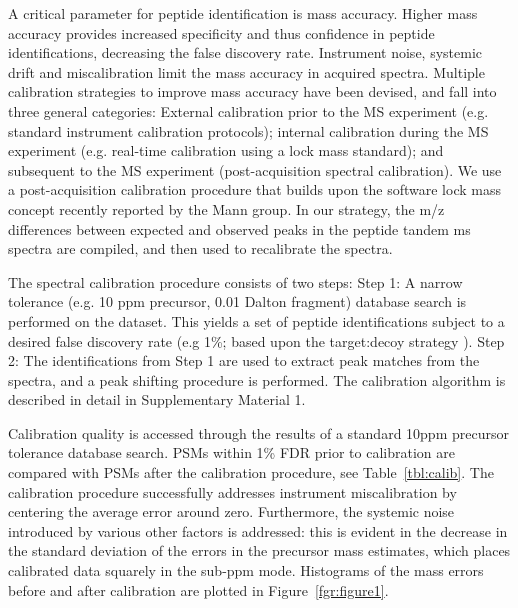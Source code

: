 \documentclass[journal=jprobs,manuscript=article]{achemso}
\begin{document}
A critical parameter for peptide identification is mass accuracy\cite{Scherl_2008}.
Higher mass accuracy provides increased specificity and thus confidence in peptide identifications, decreasing the false discovery rate.
Instrument noise, systemic drift and miscalibration limit the mass accuracy in acquired spectra.
Multiple calibration strategies to improve mass accuracy have been devised, and fall into three general categories:  External calibration prior to the MS experiment (e.g. standard instrument calibration protocols); internal calibration during the MS experiment (e.g. real-time calibration using a lock mass standard\cite{Olsen_2005}); and subsequent to the MS experiment (post-acquisition spectral calibration).
We use a post-acquisition calibration procedure that builds upon the software lock mass concept\cite{Cox_2011} recently reported by the Mann group.
In our strategy, the m/z differences between expected and observed peaks in the peptide tandem ms spectra are compiled, and then used to recalibrate the spectra.

The spectral calibration procedure consists of two steps: Step 1: A narrow tolerance (e.g. 10 ppm precursor, 0.01 Dalton fragment) database search is performed on the dataset.
This yields a set of peptide identifications subject to a desired false discovery rate (e.g 1\%; based upon the target:decoy strategy \cite{Elias_2007}).
Step 2: The identifications from Step 1 are used to extract peak matches from the spectra, and a peak shifting procedure is performed.
The calibration algorithm is described in detail in Supplementary Material 1.

Calibration quality is accessed through the results of a standard 10ppm precursor tolerance database search.
PSMs within 1\% FDR prior to calibration are compared with PSMs after the calibration procedure, see Table~\ref{tbl:calib}.
The calibration procedure successfully addresses instrument miscalibration by centering the average error around zero.
Furthermore, the systemic noise introduced by various other factors is addressed: this is evident in the decrease in the standard deviation of the errors in the precursor mass estimates, which places calibrated data squarely in the sub-ppm mode.
Histograms of the mass errors before and after calibration are plotted in Figure~\ref{fgr:figure1}.
\end{document}
